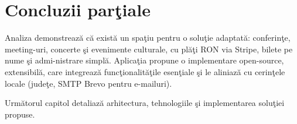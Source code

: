 \section{Concluzii par\c tiale}

Analiza demonstreaz\u a c\u a exist\u a un spa\c tiu pentru o solu\c tie adaptat\u a: conferin\c te, meeting-uri, concerte \c si evenimente culturale, cu pl\u a\c ti RON via Stripe, bilete pe nume \c si admi-nistrare simpl\u a. Aplica\c tia propune o implementare open-source, extensibil\u a, care integreaz\u a func\c tionalit\u a\c tile esen\c tiale \c si le aliniaz\u a cu cerin\c tele locale (jude\c te, SMTP Brevo pentru e-mailuri).

\vspace{0.3cm}
\noindent Urm\u atorul capitol detaliaz\u a arhitectura, tehnologiile \c si implementarea solu\c tiei propuse.
